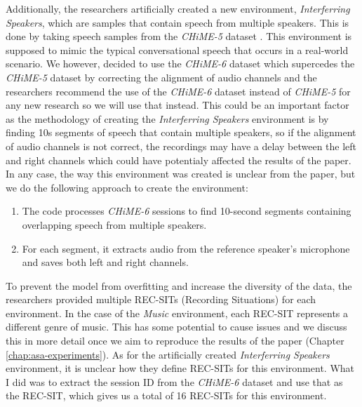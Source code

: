 \documentclass[logo,bsc,singlespacing,parskip,online]{infthesis}
\newcommand{\chime}[1]{\textit{CHiME-#1}\xspace}
\begin{document}
Additionally, the researchers artificially created a new environment, \textit{Interferring Speakers}, which are samples that contain speech from multiple speakers. 
This is done by taking speech samples from the 
\chime{5} dataset \cite{barker18_fifth_2018}. This environment is supposed to mimic the 
typical conversational speech that occurs in a real-world scenario. We however, decided to use the \chime{6} dataset which 
supercedes the \chime{5} dataset \cite{barker18_fifth_2018} by correcting the alignment of audio channels and the researchers 
recommend the use of the \chime{6} dataset instead of \chime{5} for any new research so we will use that instead. This could 
be an important factor as the methodology of creating the \textit{Interferring Speakers} environment is by finding 10s 
segments of speech that contain multiple speakers, so if the alignment of audio channels is not correct, the recordings 
may have a delay between the left and right channels which could have potentialy affected the results of the paper. 
In any case, the way this environment was created is unclear from the paper, but we do the following approach to create the environment:
\begin{enumerate}
   \item The code processes \chime{6} sessions to find 10-second segments containing overlapping speech from multiple speakers.
   \item For each segment, it extracts audio from the reference speaker's microphone and saves both left and right channels.
\end{enumerate}

To prevent the model from overfitting and increase the diversity of the data, the researchers provided multiple REC-SITs (Recording Situations) for each environment.
In the case of the \textit{Music} environment, each REC-SIT represents a different genre of music. This has some potential to cause issues 
and we discuss this in more detail once we aim to reproduce the results of the paper (Chapter \ref{chap:asa-experiments}).  %
As for the artificially created \textit{Interferring Speakers} environment, it is unclear how they define REC-SITs for this environment. 
What I did was to extract the session ID from the \chime{6} dataset and use that as the REC-SIT, which 
gives us a total of 16 REC-SITs for this environment.
\end{document}
